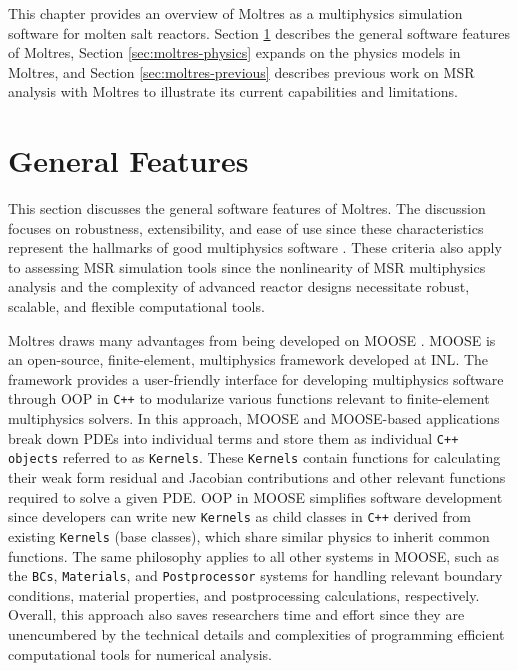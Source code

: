 This chapter provides an overview of Moltres as a multiphysics
simulation software for molten salt reactors. 
Section \ref{sec:moltres-features}
describes the general software features of Moltres, Section
\ref{sec:moltres-physics} expands on the physics models in Moltres, and Section
\ref{sec:moltres-previous} describes previous work on \gls{MSR} analysis with Moltres to illustrate
its current capabilities and limitations.

\section{General Features} \label{sec:moltres-features}

This section discusses the general software features of Moltres. The
discussion focuses on robustness, extensibility, and ease of use
since these characteristics represent the hallmarks of good multiphysics
software \cite{keyes_multiphysics_2013}. These criteria also apply to
assessing \gls{MSR} simulation tools since the nonlinearity of \gls{MSR}
multiphysics analysis and the complexity of advanced reactor designs
necessitate robust, scalable, and flexible computational tools.

Moltres draws many advantages from being developed on MOOSE
\cite{permann_moose_2020}. MOOSE is an open-source, finite-element,
multiphysics framework developed at \gls{INL}. The framework provides a
user-friendly interface for developing multiphysics software through
\gls{OOP} in \texttt{C++} to modularize various
functions relevant to finite-element multiphysics solvers. In this approach,
MOOSE and MOOSE-based applications break down \glspl{PDE} into individual terms
and store them as individual \texttt{C++ objects} referred to as
\texttt{Kernels}. These \texttt{Kernels} contain functions for calculating
their weak form residual and Jacobian
contributions and other relevant functions required to solve a given
\gls{PDE}. \gls{OOP} in MOOSE simplifies software development
since developers can write new \texttt{Kernels} as child classes in
\texttt{C++} derived from existing \texttt{Kernels} (base classes), which share
similar physics to inherit common functions.
The same philosophy applies to all other systems in MOOSE, such as
the \texttt{BCs}, \texttt{Materials}, and \texttt{Postprocessor}
systems for handling relevant boundary conditions, material properties, and
postprocessing calculations, respectively. Overall, this approach also saves
researchers time and effort since they are unencumbered by the technical details
and complexities of programming efficient computational tools for
numerical analysis.

